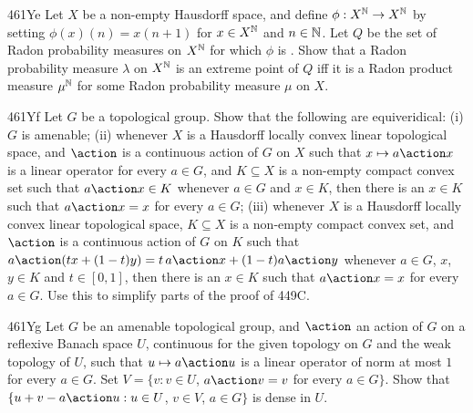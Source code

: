 {\spheader 461Ye Let $X$ be a non-empty Hausdorff space, and define
$\phi:X^{\Bbb N}\to X^{\Bbb N}$ by setting $\phi(x)(n)=x(n+1)$ for
$x\in X^{\Bbb N}$ and $n\in\Bbb N$.
Let $Q$ be the set of Radon probability measures
on $X^{\Bbb N}$ for which $\phi$ is \imp.   Show that a Radon
probability measure $\lambda$ on $X^{\Bbb N}$ is an extreme point of
$Q$ iff it is a Radon product measure $\mu^{\Bbb N}$ for some Radon
probability measure $\mu$ on $X$.

\spheader 461Yf Let $G$ be a topological group.   Show that the following
are equiveridical:  (i) $G$ is amenable;  (ii) whenever $X$ is a Hausdorff
locally convex linear topological space, and
$\action$ is a continuous action of $G$ on $X$ such that
$x\mapsto a\action x$ is a linear operator for every $a\in G$, and
$K\subseteq X$ is a
non-empty compact convex set such that $a\action x\in K$ whenever
$a\in G$ and $x\in K$, then there is an $x\in K$ such that
$a\action x=x$ for every $a\in G$;
(iii) whenever $X$ is a Hausdorff
locally convex linear topological space, $K\subseteq X$ is a non-empty
compact convex set, and
$\action$ is a continuous action of $G$ on $K$ such that
$a\action(tx+(1-t)y)=t\,a\action x+(1-t)a\action y$ whenever $a\in G$, $x$,
$y\in K$ and $t\in[0,1]$, then there is an $x\in K$ such that
$a\action x=x$ for every $a\in G$.
Use this to simplify parts of the proof of 449C.   

\spheader 461Yg Let $G$ be an amenable topological group, and $\action$ an
action of $G$ on a reflexive Banach space $U$, continuous for the
given topology on $G$ and the weak topology of $U$, such that
$u\mapsto a\action u$ is a linear operator of
norm at most $1$ for every $a\in G$.   Set
$V=\{v:v\in U$, $a\action v=v$ for every $a\in G\}$.   Show that
$\{u+v-a\action u:u\in U$, $v\in V$, $a\in G\}$ is dense in $U$.
}%

